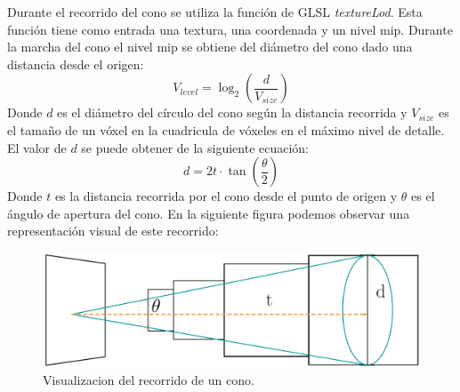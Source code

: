 Durante el recorrido del cono se utiliza la función de GLSL \emph{textureLod}. Esta función tiene como entrada una textura, una coordenada y un nivel mip. Durante la marcha del cono el nivel mip se obtiene del diámetro del cono dado una distancia desde el origen:
\begin{equation}
	V_{level} = \log_2(\frac{d}{V_{size}})
\end{equation}
Donde $d$ es el diámetro del círculo del cono según la distancia recorrida y $V_{size}$ es el tamaño de un vóxel en la cuadricula de vóxeles en el máximo nivel de detalle. El valor de $d$ se puede obtener de la siguiente ecuación:
\begin{equation}
	d = 2t\cdot\tan(\frac{\theta}{2})
\end{equation}
Donde $t$ es la distancia recorrida por el cono desde el punto de origen y $\theta$ es el ángulo de apertura del cono. En la siguiente figura podemos observar una representación visual de este recorrido:
\begin{figure}[H]
	\centering
	\captionsetup{justification=centering}
	\includegraphics[width=.9\linewidth]{media/cone.pdf}
	\caption{Visualizacion del recorrido de un cono.}
\end{figure}

